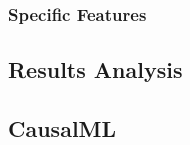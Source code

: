 \documentclass[12pt,letterpaper]{article}
\begin{document}
\subsubsection{Specific Features}







\subsection{Results Analysis}





\subsection{CausalML}
%
%
\clearpage
\end{document}
